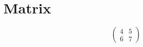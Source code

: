 \documentclass[a4paper,10pt]{article}
\begin{document}
\section{Matrix}

\begin{equation}
\begin{pmatrix}
4 & 5 \\
6 & 7
\end{pmatrix}
\end{equation}
\end{document}
